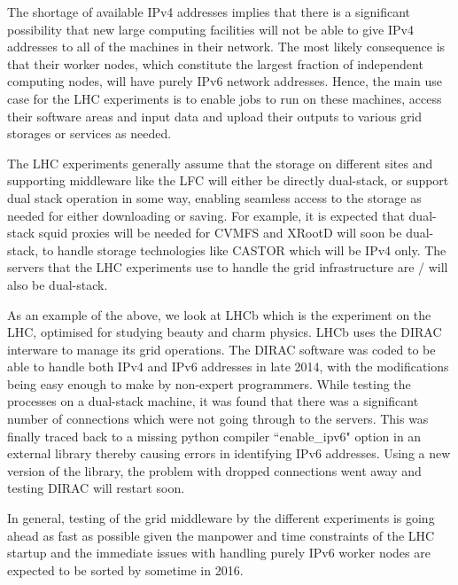 

The shortage of available IPv4 addresses implies that there is a significant possibility that new large
computing facilities will not be able to give IPv4 addresses to all of the machines in their network. The
most likely consequence is that their worker nodes, which constitute the largest fraction of
independent computing nodes, will have purely IPv6 network addresses. Hence, the main use case for the LHC
experiments is to enable jobs to run on these machines, access their software areas and input data and
upload their outputs to various grid storages or services as needed.

The LHC experiments generally assume \cite{LHCassumption} that the storage on different sites and
supporting middleware \cite{middleware} like the LFC will either be directly dual-stack, or support
dual stack operation in some way, enabling seamless access to the storage as needed for either downloading
or saving. For example, it is expected that dual-stack squid proxies will be needed for CVMFS and XRootD
will soon be dual-stack, to handle storage technologies like CASTOR which will be IPv4 only. The
servers that the LHC experiments use to handle the grid infrastructure are / will also be dual-stack.

As an example of the above, we look at LHCb \cite{LHCb} which is the experiment on the LHC, optimised
for studying beauty and charm physics. LHCb uses the DIRAC \cite{DIRAC} interware to manage its grid
operations. The DIRAC software was coded to be able to handle both IPv4 and IPv6 addresses in late 2014,
with the modifications being easy enough to make by non-expert programmers. While testing the processes
on a dual-stack machine, it was found that there was a significant number of connections which were not
going through to the servers. This was finally traced back to a missing python compiler ``enable\_ipv6" option in an external library thereby causing errors in identifying IPv6 addresses. Using a new version of the library, the
problem with dropped connections went away and testing DIRAC will restart soon.

In general, testing of the grid middleware by the different experiments is going ahead as fast as possible
given the manpower and time constraints of the LHC startup and the immediate issues with handling purely
IPv6 worker nodes are expected to be sorted by sometime in 2016.


